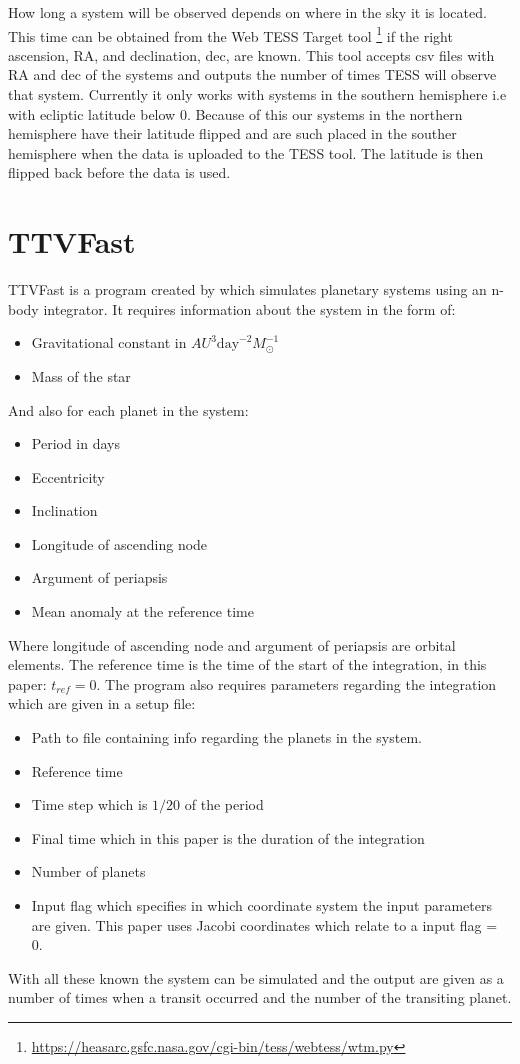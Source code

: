 \documentclass[12pt]{report}
\begin{document}
	How long a system will be observed depends on where in the sky it is located. This time can be obtained from the Web TESS Target tool \footnote{\url{https://heasarc.gsfc.nasa.gov/cgi-bin/tess/webtess/wtm.py}} if the right ascension, RA, and declination, dec, are known. This tool accepts csv files with RA and dec of the systems and outputs the number of times TESS will observe that system. Currently it only works with systems in the southern hemisphere i.e with ecliptic latitude below 0. Because of this our systems in the northern hemisphere have their latitude flipped and are such placed in the souther hemisphere when the data is uploaded to the TESS tool. The latitude is then flipped back before the data is used. 
	

\section{TTVFast}
\label{TTVFast_method}
	TTVFast is a program created by \cite{2014ApJ...787..132D} which simulates planetary systems using an n-body integrator. It requires information about the system in the form of:
	\begin{itemize}
		\setlength\itemsep{-.3em}
		\item Gravitational constant in $AU^3 \mathrm{day}^{-2}M_{\odot}^{-1}$
		\item Mass of the star 
	\end{itemize}
	And also for each planet in the system:
	\begin{itemize}
		\setlength\itemsep{-.3em}
		\item Period in days 
		\item Eccentricity
		\item Inclination 
		\item Longitude of ascending node
		\item Argument of periapsis 
		\item Mean anomaly at the reference time 
	\end{itemize}
	Where longitude of ascending node and argument of periapsis are orbital elements. The reference time is the time of the start of the integration, in this paper: $t_{ref}=0$. The program also requires parameters regarding the integration which are given in a setup file:
	\begin{itemize}
		\setlength\itemsep{-.3em}
		\item Path to file containing info regarding the planets in the system.
		\item Reference time
		\item Time step which is $1/20$ of the period
		\item Final time which in this paper is the duration of the integration
		\item Number of planets
		\item Input flag which specifies in which coordinate system the input parameters are given. This paper uses Jacobi coordinates which relate to a input flag = 0.
	\end{itemize}
	With all these known the system can be simulated and the output are given as a number of times when a transit occurred and the number of the transiting planet.
\end{document}
